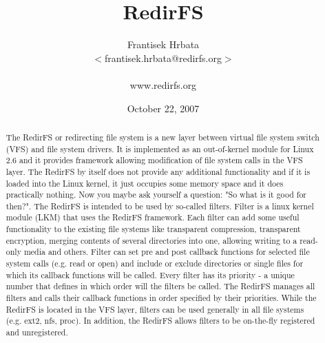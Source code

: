 \documentclass[oneside, 11pt, a4]{article}
\begin{document}
\title{RedirFS}
\author{Frantisek Hrbata\\ $<$frantisek.hrbata@redirfs.org$>$\\ \\ www.redirfs.org}
\date{October 22, 2007}
\maketitle

\begin{abstract}
The RedirFS or redirecting file system is a new layer between virtual file
system switch (VFS) and file system drivers. It is implemented as an
out-of-kernel module for Linux 2.6 and it provides framework allowing
modification of file system calls in the VFS layer. The RedirFS by itself does
not provide any additional functionality and if it is loaded into the Linux
kernel, it just occupies some memory space and it does practically nothing. Now
you maybe ask yourself a question: "So what is it good for then?". The RedirFS
is intended to be used by so-called filters. Filter is a linux kernel module
(LKM) that uses the RedirFS framework. Each filter can add some useful
functionality to the existing file systems like transparent compression,
transparent encryption, merging contents of several directories into one,
allowing writing to a read-only media and others. Filter can set pre and post
callback functions for selected file system calls (e.g. read or open) and
include or exclude directories or single files for which its callback
functions will be called. Every filter has its priority - a unique number that
defines in which order will the filters be called. The RedirFS manages all
filters and calls their callback functions in order specified by their
priorities. While the RedirFS is located in the VFS layer, filters can be used
generally in all file systems (e.g. ext2, nfs, proc). In addition, the RedirFS
allows filters to be on-the-fly registered and unregistered.




\end{abstract}
\end{document}
